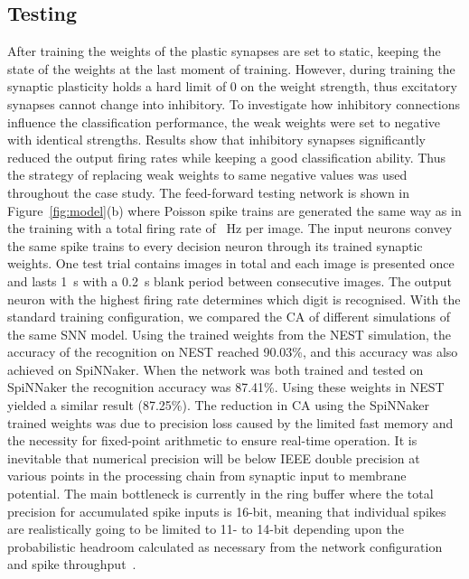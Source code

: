 \subsection{Testing}
After training the weights of the plastic synapses are set to static, keeping the state of the weights at the last moment of training.
However, during training the synaptic plasticity holds a hard limit of 0 on the weight strength, thus excitatory synapses cannot change into inhibitory.
To investigate how inhibitory connections influence the classification performance, the weak weights were set to negative with identical strengths.
Results show that inhibitory synapses significantly reduced the output firing rates while keeping a good classification ability.
Thus the strategy of replacing weak weights to \DIFaddbegin {}\DIFaddend same negative values was used throughout the case study.
The feed-forward testing network is shown in Figure~\ref{fig:model}(b) where Poisson spike trains are generated the same way as in the training with a total firing rate of \DIFdelbegin {}\DIFdelend \DIFaddbegin {}\DIFaddend ~Hz per image.
The input neurons convey the same spike trains to every decision neuron through its \DIFdelbegin {}\DIFdelend \DIFaddbegin {}\DIFaddend trained synaptic weights. 
One test trial contains \DIFdelbegin {}\DIFdelend \DIFaddbegin {}\DIFaddend images in total and each image is presented once and lasts 1~s with a 0.2~s blank period between consecutive images.
The output neuron with the highest firing rate determines which digit is recognised.
With the standard training configuration, we compared the CA of different simulations of the same SNN model.
Using the trained weights from the NEST simulation, the accuracy of the recognition on NEST reached 90.03\%, and this accuracy was also achieved on SpiNNaker.
When the network was both trained and tested on SpiNNaker the recognition accuracy was 87.41\%.
Using these weights in NEST yielded a similar result (87.25\%). 
The reduction in CA using the SpiNNaker trained weights was due to precision loss caused by the limited fast memory and the necessity for fixed-point arithmetic to ensure real-time operation.
It is inevitable that numerical precision will be below IEEE double precision at various points in the processing chain from synaptic input to membrane potential.
The main bottleneck is currently in the ring buffer where the total precision for accumulated spike inputs is 16-bit, meaning that individual spikes are realistically going to be limited to 11- to 14-bit depending upon the probabilistic headroom calculated as necessary from the network configuration and spike throughput~\citep{Hopkins2015Accuracy}.


